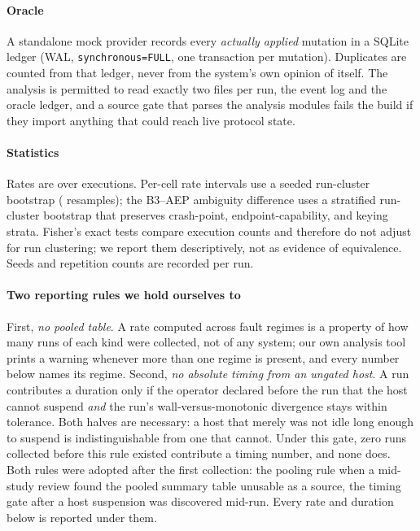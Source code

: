 \paragraph{Oracle} A standalone mock provider records every \emph{actually
applied} mutation in a SQLite ledger (WAL, \texttt{synchronous=FULL}, one
transaction per mutation). Duplicates are counted from that ledger, never from
the system's own opinion of itself. The analysis is permitted to read exactly
two files per run, the event log and the oracle ledger, and a source gate
that parses the analysis modules fails the build if they import anything that
could reach live protocol state.

\paragraph{Statistics} Rates are over executions. Per-cell rate intervals use
a seeded run-cluster bootstrap (\BootstrapResamples{} resamples); the
B3--AEP ambiguity difference uses a stratified run-cluster bootstrap that
preserves crash-point, endpoint-capability, and keying strata. Fisher's exact
tests compare execution counts and therefore do not adjust for run clustering;
we report them descriptively, not as evidence of equivalence. Seeds and
repetition counts are recorded per run.

\paragraph{Two reporting rules we hold ourselves to} First, \emph{no pooled
table}. A rate computed across fault regimes is a property of how many runs of
each kind were collected, not of any system; our own analysis tool prints a
warning whenever more than one regime is present, and every number below names
its regime. Second, \emph{no absolute timing from an ungated host}. A run
contributes a duration only if the operator declared before the run that the
host cannot suspend \emph{and} the run's wall-versus-monotonic divergence stays
within tolerance. Both halves are necessary: a host that merely was not idle
long enough to suspend is indistinguishable from one that cannot. Under this
gate, zero runs collected before this rule existed contribute a timing
number, and none does. Both rules were adopted after the first collection:
the pooling rule when a mid-study review found the pooled summary table
unusable as a source, the timing gate after a host suspension was discovered
mid-run. Every rate and duration below is reported under them.

